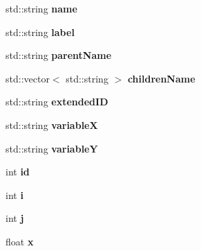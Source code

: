\begin{DoxyCompactItemize}
\item 
\hypertarget{classElement_a159736231f5227e65e36f4a9e5537afd}{std\+::string {\bfseries name}}\label{classElement_a159736231f5227e65e36f4a9e5537afd}

\item 
\hypertarget{classElement_a2e3029a6dec4d74046ce1e4efe72d5f7}{std\+::string {\bfseries label}}\label{classElement_a2e3029a6dec4d74046ce1e4efe72d5f7}

\item 
\hypertarget{classElement_abe6237e9f33c87cca4e24ed5ebc51bfb}{std\+::string {\bfseries parent\+Name}}\label{classElement_abe6237e9f33c87cca4e24ed5ebc51bfb}

\item 
\hypertarget{classElement_ab1248ff46559a0cb27d56568e6e479f5}{std\+::vector$<$ std\+::string $>$ {\bfseries children\+Name}}\label{classElement_ab1248ff46559a0cb27d56568e6e479f5}

\item 
\hypertarget{classElement_aff44a78d101de8f17f4448e0bc65e4a2}{std\+::string {\bfseries extended\+I\+D}}\label{classElement_aff44a78d101de8f17f4448e0bc65e4a2}

\item 
\hypertarget{classElement_ab176775b7d8a64ad8a8cc24e1f0f3d3f}{std\+::string {\bfseries variable\+X}}\label{classElement_ab176775b7d8a64ad8a8cc24e1f0f3d3f}

\item 
\hypertarget{classElement_ad34ac2c8cf07782f878b2ae48f69c4c4}{std\+::string {\bfseries variable\+Y}}\label{classElement_ad34ac2c8cf07782f878b2ae48f69c4c4}

\item 
\hypertarget{classElement_a3bd136c994cd7b24a62cb464f78990ad}{int {\bfseries id}}\label{classElement_a3bd136c994cd7b24a62cb464f78990ad}

\item 
\hypertarget{classElement_ae973e652f252c0d41cf2f251c07fcf30}{int {\bfseries i}}\label{classElement_ae973e652f252c0d41cf2f251c07fcf30}

\item 
\hypertarget{classElement_afc114c80c73d8264637ab15b022a6ad2}{int {\bfseries j}}\label{classElement_afc114c80c73d8264637ab15b022a6ad2}

\item 
\hypertarget{classElement_a32de6866d49c3cd4634f290fde2280d3}{float {\bfseries x}}\label{classElement_a32de6866d49c3cd4634f290fde2280d3}


\end{DoxyCompactItemize}
